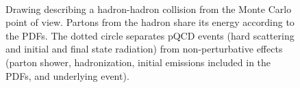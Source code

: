 \begin{figure}[tbph]
\begin{center}
\caption{Drawing describing a hadron-hadron collision from the Monte Carlo
point of view. Partons from the hadron share its energy according to the PDFs. 
The dotted circle separates pQCD events (hard scattering 
and initial and final state radiation) from non-perturbative effects (parton shower, 
hadronization, initial emissions included in the PDFs, and underlying event)\cite{Mangano:933464}.\label{fig:collision}}
	\\

\end{center}
\end{figure}
